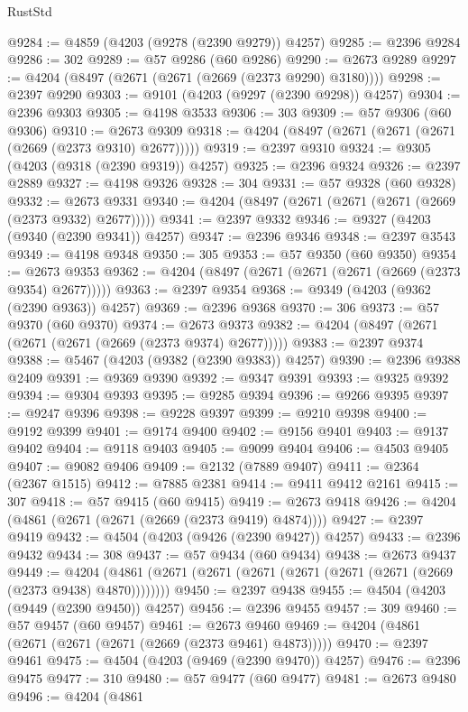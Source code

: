 \begin{lexlean}{RustStd}
\begin{coremodule}
@9284 := @4859 (@4203 (@9278 (@2390 @9279)) @4257)
@9285 := @2396 @9284
@9286 := 302
@9289 := @57 @9286 (@60 @9286)
@9290 := @2673 @9289
@9297 := @4204 (@8497 (@2671 (@2671 (@2669 (@2373 @9290) @3180))))
@9298 := @2397 @9290
@9303 := @9101 (@4203 (@9297 (@2390 @9298)) @4257)
@9304 := @2396 @9303
@9305 := @4198 @3533
@9306 := 303
@9309 := @57 @9306 (@60 @9306)
@9310 := @2673 @9309
@9318 := @4204 (@8497 (@2671 (@2671 (@2671 (@2669 (@2373 @9310) @2677)))))
@9319 := @2397 @9310
@9324 := @9305 (@4203 (@9318 (@2390 @9319)) @4257)
@9325 := @2396 @9324
@9326 := @2397 @2889
@9327 := @4198 @9326
@9328 := 304
@9331 := @57 @9328 (@60 @9328)
@9332 := @2673 @9331
@9340 := @4204 (@8497 (@2671 (@2671 (@2671 (@2669 (@2373 @9332) @2677)))))
@9341 := @2397 @9332
@9346 := @9327 (@4203 (@9340 (@2390 @9341)) @4257)
@9347 := @2396 @9346
@9348 := @2397 @3543
@9349 := @4198 @9348
@9350 := 305
@9353 := @57 @9350 (@60 @9350)
@9354 := @2673 @9353
@9362 := @4204 (@8497 (@2671 (@2671 (@2671 (@2669 (@2373 @9354) @2677)))))
@9363 := @2397 @9354
@9368 := @9349 (@4203 (@9362 (@2390 @9363)) @4257)
@9369 := @2396 @9368
@9370 := 306
@9373 := @57 @9370 (@60 @9370)
@9374 := @2673 @9373
@9382 := @4204 (@8497 (@2671 (@2671 (@2671 (@2669 (@2373 @9374) @2677)))))
@9383 := @2397 @9374
@9388 := @5467 (@4203 (@9382 (@2390 @9383)) @4257)
@9390 := @2396 @9388 @2409
@9391 := @9369 @9390
@9392 := @9347 @9391
@9393 := @9325 @9392
@9394 := @9304 @9393
@9395 := @9285 @9394
@9396 := @9266 @9395
@9397 := @9247 @9396
@9398 := @9228 @9397
@9399 := @9210 @9398
@9400 := @9192 @9399
@9401 := @9174 @9400
@9402 := @9156 @9401
@9403 := @9137 @9402
@9404 := @9118 @9403
@9405 := @9099 @9404
@9406 := @4503 @9405
@9407 := @9082 @9406
@9409 := @2132 (@7889 @9407)
@9411 := @2364 (@2367 @1515)
@9412 := @7885 @2381
@9414 := @9411 @9412 @2161
@9415 := 307
@9418 := @57 @9415 (@60 @9415)
@9419 := @2673 @9418
@9426 := @4204 (@4861 (@2671 (@2671 (@2669 (@2373 @9419) @4874))))
@9427 := @2397 @9419
@9432 := @4504 (@4203 (@9426 (@2390 @9427)) @4257)
@9433 := @2396 @9432
@9434 := 308
@9437 := @57 @9434 (@60 @9434)
@9438 := @2673 @9437
@9449 := @4204 (@4861 (@2671 (@2671 (@2671 (@2671 (@2671 (@2671 (@2669 (@2373 @9438) @4870))))))))
@9450 := @2397 @9438
@9455 := @4504 (@4203 (@9449 (@2390 @9450)) @4257)
@9456 := @2396 @9455
@9457 := 309
@9460 := @57 @9457 (@60 @9457)
@9461 := @2673 @9460
@9469 := @4204 (@4861 (@2671 (@2671 (@2671 (@2669 (@2373 @9461) @4873)))))
@9470 := @2397 @9461
@9475 := @4504 (@4203 (@9469 (@2390 @9470)) @4257)
@9476 := @2396 @9475
@9477 := 310
@9480 := @57 @9477 (@60 @9477)
@9481 := @2673 @9480
@9496 := @4204
    (@4861

\end{coremodule}
\end{lexlean}
